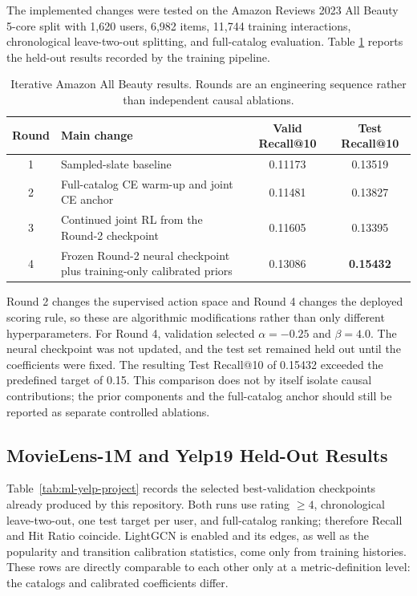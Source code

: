 \documentclass[11pt,a4paper]{article}
\begin{document}
The implemented changes were tested on the Amazon Reviews 2023 All Beauty
5-core split with 1,620 users, 6,982 items, 11,744 training interactions,
chronological leave-two-out splitting, and full-catalog evaluation. Table
\ref{tab:amazon-iterations} reports the held-out results recorded by the
training pipeline.

\begin{table}[H]
\centering
\caption{Iterative Amazon All Beauty results. Rounds are an engineering
sequence rather than independent causal ablations.}
\label{tab:amazon-iterations}
\begin{tabularx}{\textwidth}{cXcc}
\toprule
Round & Main change & Valid Recall@10 & Test Recall@10\\
\midrule
1 & Sampled-slate baseline & 0.11173 & 0.13519\\
2 & Full-catalog CE warm-up and joint CE anchor & 0.11481 & 0.13827\\
3 & Continued joint RL from the Round-2 checkpoint & 0.11605 & 0.13395\\
4 & Frozen Round-2 neural checkpoint plus training-only calibrated priors &
0.13086 & \textbf{0.15432}\\
\bottomrule
\end{tabularx}
\end{table}

Round 2 changes the supervised action space and Round 4 changes the deployed
scoring rule, so these are algorithmic modifications rather than only different
hyperparameters. For Round 4, validation selected $\alpha=-0.25$ and
$\beta=4.0$. The neural checkpoint was not updated, and the test set remained
held out until the coefficients were fixed. The resulting Test Recall@10 of
0.15432 exceeded the predefined target of 0.15. This comparison does not by
itself isolate causal contributions; the prior components and the full-catalog
anchor should still be reported as separate controlled ablations.

\subsection{MovieLens-1M and Yelp19 Held-Out Results}

Table~\ref{tab:ml-yelp-project} records the selected best-validation checkpoints
already produced by this repository. Both runs use rating $\geq4$,
chronological leave-two-out, one test target per user, and full-catalog ranking;
therefore Recall and Hit Ratio coincide. LightGCN is enabled and its edges, as
well as the popularity and transition calibration statistics, come only from
training histories. These rows are directly comparable to each other only at a
metric-definition level: the catalogs and calibrated coefficients differ.
\end{document}
